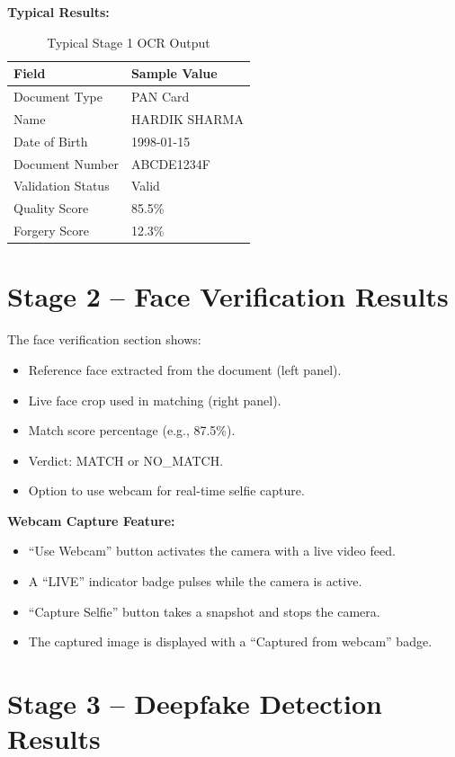 \textbf{Typical Results:}

\begin{table}[H]
\centering
\caption{Typical Stage 1 OCR Output}
\begin{tabular}{@{}ll@{}}
\toprule
\textbf{Field} & \textbf{Sample Value} \\
\midrule
Document Type & PAN Card \\
Name & HARDIK SHARMA \\
Date of Birth & 1998-01-15 \\
Document Number & ABCDE1234F \\
Validation Status & Valid \\
Quality Score & 85.5\% \\
Forgery Score & 12.3\% \\
\bottomrule
\end{tabular}
\end{table}

\section{Stage 2 -- Face Verification Results}

The face verification section shows:
\begin{itemize}
    \item Reference face extracted from the document (left panel).
    \item Live face crop used in matching (right panel).
    \item Match score percentage (e.g., 87.5\%).
    \item Verdict: MATCH or NO\_MATCH.
    \item Option to use webcam for real-time selfie capture.
\end{itemize}

\textbf{Webcam Capture Feature:}
\begin{itemize}
    \item ``Use Webcam'' button activates the camera with a live video feed.
    \item A ``LIVE'' indicator badge pulses while the camera is active.
    \item ``Capture Selfie'' button takes a snapshot and stops the camera.
    \item The captured image is displayed with a ``Captured from webcam'' badge.
\end{itemize}

\section{Stage 3 -- Deepfake Detection Results}

